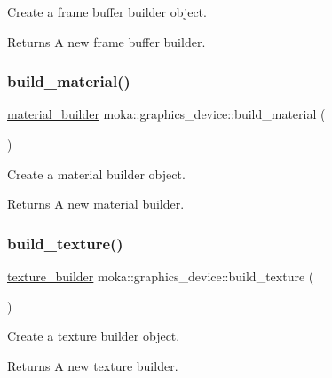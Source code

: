 Create a frame buffer builder object. 

\begin{DoxyReturn}{Returns}
A new frame buffer builder. 
\end{DoxyReturn}
\mbox{\label{classmoka_1_1graphics__device_a27af1d1f6659660f6d355e96f6d0f3e8}} 
\subsubsection{\texorpdfstring{build\_material()}{build\_material()}}
{\footnotesize\ttfamily \mbox{\hyperlink{classmoka_1_1material__builder}{material\+\_\+builder}} moka\+::graphics\+\_\+device\+::build\+\_\+material (\begin{DoxyParamCaption}{ }\end{DoxyParamCaption})}



Create a material builder object. 

\begin{DoxyReturn}{Returns}
A new material builder. 
\end{DoxyReturn}
\mbox{\label{classmoka_1_1graphics__device_a67ed8e94298f76d86e04226cf6bccda0}} 
\subsubsection{\texorpdfstring{build\_texture()}{build\_texture()}}
{\footnotesize\ttfamily \mbox{\hyperlink{classmoka_1_1texture__builder}{texture\+\_\+builder}} moka\+::graphics\+\_\+device\+::build\+\_\+texture (\begin{DoxyParamCaption}{ }\end{DoxyParamCaption})}



Create a texture builder object. 

\begin{DoxyReturn}{Returns}
A new texture builder. 
\end{DoxyReturn}
\mbox{\label{classmoka_1_1graphics__device_a94450828710a9008a67bc6095fc1bbb6}} 
